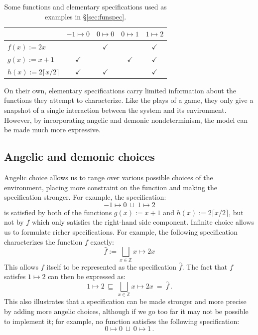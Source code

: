 \documentclass[11pt,oneside,draft]{book}
\theoremstyle{definition}
\begin{document}
\begin{table}
  \centering
  \begin{tabular}{lcccc}
    \hline &
      $-1 \mapsto 0$ &
      $0 \mapsto 0$ &
      $0 \mapsto 1$ &
      $1 \mapsto 2$ \\
    \hline
      $f(x) := 2x$ & & $\checkmark$ & & $\checkmark$ \\
      $g(x) := x + 1$ & $\checkmark$ & & $\checkmark$ & $\checkmark$ \\
      $h(x) := 2 \lceil x / 2 \rceil$ & $\checkmark$ & $\checkmark$ & & $\checkmark$ \\
    \hline
  \end{tabular}
  \caption{%
    Some functions and elementary specifications
    used as examples in \S\ref{sec:funspec}.}
  \label{tbl:funspec}
\end{table}

On their own,
elementary specifications
carry limited information about the functions
they attempt to characterize.
Like the plays of a game,
they only give a snapshot of a single
interaction between the system and its environment.
However,
by incorporating angelic and demonic nondeterminism,
the model can be made much more expressive.


\subsection{Angelic and demonic choices} %

Angelic choice allows us to range over
various possible choices of the environment,
placing more constraint on the function and
making the specification stronger.
For example,
the specification:
\[
    -1 \mapsto 0
    \: \sqcup \:
    1 \mapsto 2
\]
is satisfied by both of the functions
$g(x) := x + 1$ and $h(x) := 2 \lceil x / 2 \rceil$,
but not by $f$ which only satisfies the right-hand side component.
Infinite choice allows us to formulate
richer specifications.
For example, the following specification
characterizes the function $f$ exactly:
\[
  \hat{f} := \bigsqcup_{x \in \mathbb{Z}} x \mapsto 2x
\]
This allows $f$ itself to be represented as the specification $\hat{f}$.
The fact that $f$ satisfes $1 \mapsto 2$ can then be expressed as:
\[
  1 \mapsto 2
  \: \sqsubseteq \:
  \bigsqcup_{x \in \mathbb{Z}} x \mapsto 2x
  \: = \:
  \hat{f}
  \,.
\]
This also illustrates that
a specification can be made stronger
and more precise by adding more angelic choices,
although if we go too far it may not be possible to implement it;
for example, no function satisfies
the following specification:
\[
  0 \mapsto 0 \: \sqcup \: 0 \mapsto 1
  \,.
\]
\end{document}
